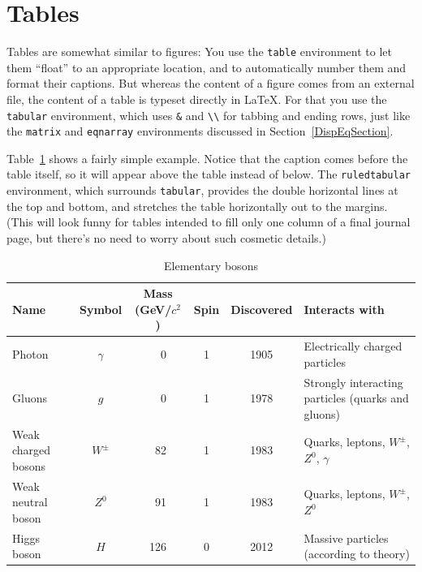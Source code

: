 \documentclass[prb,preprint]{revtex4-2}
\begin{document}
\section{Tables}

Tables are somewhat similar to figures:  You use the \texttt{table} environment
to let them ``float'' to an appropriate location, and to automatically number
them and format their captions.  But whereas the content of a figure comes
from an external file, the content of a table is typeset directly in \LaTeX.
For that you use the \texttt{tabular} environment, which uses \verb/&/ and
\verb/\\/ for tabbing and ending rows, just like the \texttt{matrix} and
\texttt{eqnarray} environments discussed in Section~\ref{DispEqSection}.

Table~\ref{bosons} shows a fairly simple example.  Notice that the caption comes
before the table itself, so it will appear above the table instead of below.
The \texttt{ruledtabular} environment, which surrounds \texttt{tabular},
provides the double horizontal lines at the top and bottom, and stretches
the table horizontally out to the margins.  (This will look funny for tables
intended to fill only one column of a final journal page, but there's no 
need to worry about such cosmetic details.)

\begin{table}[h!]
\centering
\caption{Elementary bosons}
\begin{ruledtabular}
\begin{tabular}{l c c c c p{5cm}}
Name & Symbol & Mass (GeV/$c^2$) & Spin & Discovered & Interacts with \\
\hline	%
Photon & $\gamma$ & \ \ 0 & 1 & 1905 & Electrically charged particles \\
Gluons & $g$ & \ \ 0 & 1 & 1978 & Strongly interacting particles (quarks and gluons) \\
Weak charged bosons & $W^\pm$ & \ 82 & 1 & 1983 & Quarks, leptons, $W^\pm$, $Z^0$, $\gamma$ \\
Weak neutral boson & $Z^0$ & \ 91 & 1 & 1983 & Quarks, leptons, $W^\pm$, $Z^0$ \\
Higgs boson & $H$ & 126 & 0 & 2012 & Massive particles (according to theory) \\
\end{tabular}
\end{ruledtabular}
\label{bosons}
\end{table}
\end{document}
